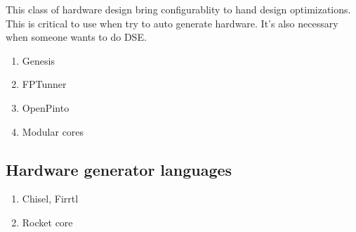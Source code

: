 This class of hardware design bring configurablity to hand design optimizations. This is critical to use when try to auto generate hardware.
It's also necessary when someone wants to do DSE.
\begin{enumerate}
    \item Genesis
    \item FPTunner
    \item OpenPinto
    \item Modular cores
\end{enumerate}

\subsection{Hardware generator languages}
\begin{enumerate}
    \item Chisel, Firrtl
    \item Rocket core
\end{enumerate}